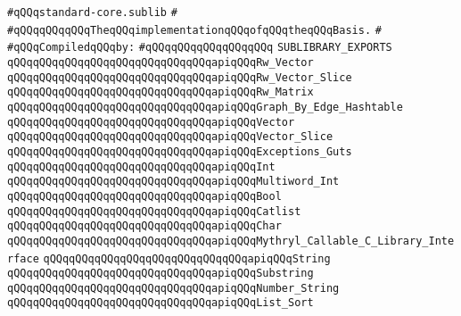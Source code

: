 \label{src/lib/std/src/standard-core.sublib}
\verb|#qQQqstandard-core.sublib|\newline
\verb|#|\newline
\verb|#qQQqqQQqqQQqTheqQQqimplementationqQQqofqQQqtheqQQqBasis.|\newline
\verb|#|\newline
\newline
\verb|#qQQqCompiledqQQqby:|\newline
\verb|#qQQqqQQqqQQqqQQqqQQq|\newline
\newline
\verb|SUBLIBRARY_EXPORTS|\newline
\newline
\verb|qQQqqQQqqQQqqQQqqQQqqQQqqQQqqQQqapiqQQqRw_Vector|\newline
\verb|qQQqqQQqqQQqqQQqqQQqqQQqqQQqqQQqapiqQQqRw_Vector_Slice|\newline
\verb|qQQqqQQqqQQqqQQqqQQqqQQqqQQqqQQqapiqQQqRw_Matrix|\newline
\verb|qQQqqQQqqQQqqQQqqQQqqQQqqQQqqQQqapiqQQqGraph_By_Edge_Hashtable|\newline
\verb|qQQqqQQqqQQqqQQqqQQqqQQqqQQqqQQqapiqQQqVector|\newline
\verb|qQQqqQQqqQQqqQQqqQQqqQQqqQQqqQQqapiqQQqVector_Slice|\newline
\verb|qQQqqQQqqQQqqQQqqQQqqQQqqQQqqQQqapiqQQqExceptions_Guts|\newline
\verb|qQQqqQQqqQQqqQQqqQQqqQQqqQQqqQQqapiqQQqInt|\newline
\verb|qQQqqQQqqQQqqQQqqQQqqQQqqQQqqQQqapiqQQqMultiword_Int|\newline
\verb|qQQqqQQqqQQqqQQqqQQqqQQqqQQqqQQqapiqQQqBool|\newline
\verb|qQQqqQQqqQQqqQQqqQQqqQQqqQQqqQQqapiqQQqCatlist|\newline
\verb|qQQqqQQqqQQqqQQqqQQqqQQqqQQqqQQqapiqQQqChar|\newline
\verb|qQQqqQQqqQQqqQQqqQQqqQQqqQQqqQQqapiqQQqMythryl_Callable_C_Library_Interface|\newline
\verb|qQQqqQQqqQQqqQQqqQQqqQQqqQQqqQQqapiqQQqString|\newline
\verb|qQQqqQQqqQQqqQQqqQQqqQQqqQQqqQQqapiqQQqSubstring|\newline
\verb|qQQqqQQqqQQqqQQqqQQqqQQqqQQqqQQqapiqQQqNumber_String|\newline
\verb|qQQqqQQqqQQqqQQqqQQqqQQqqQQqqQQqapiqQQqList_Sort|\newline
